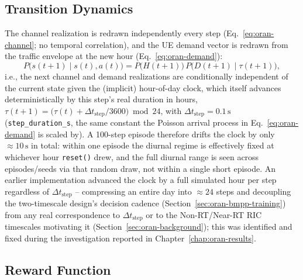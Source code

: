 \subsection{Transition Dynamics}

The channel realization is redrawn independently every step
(Eq.~\ref{eq:oran-channel}; no temporal correlation), and the UE demand
vector is redrawn from the traffic envelope at the new hour
(Eq.~\ref{eq:oran-demand}):
\begin{equation}
  P\big(s(t+1) \mid s(t), a(t)\big) = P\big(H(t+1)\big)\, P\big(D(t+1) \mid \tau(t+1)\big),
  \label{eq:oran-transition}
\end{equation}
i.e., the next channel and demand realizations are conditionally
independent of the current state given the (implicit) hour-of-day clock,
which itself advances deterministically by this step's real duration in
hours, $\tau(t+1) = \big(\tau(t) + \Delta t_{\mathrm{step}}/3600\big) \bmod 24$,
with $\Delta t_{\mathrm{step}} = 0.1\,\mathrm{s}$ (\texttt{step\_duration\_s},
the same constant the Poisson arrival process in
Eq.~\ref{eq:oran-demand} is scaled by). A 100-step episode therefore
drifts the clock by only $\approx\!10\,\mathrm{s}$ in total: within one
episode the diurnal regime is effectively fixed at whichever hour
\texttt{reset()} drew, and the full diurnal range is seen across
episodes/seeds via that random draw, not within a single short episode.
An earlier implementation advanced the clock by a full simulated hour
per step regardless of $\Delta t_{\mathrm{step}}$ -- compressing an
entire day into $\approx\!24$ steps and decoupling the two-timescale
design's decision cadence (Section~\ref{sec:oran-bmpp-training}) from any
real correspondence to $\Delta t_{\mathrm{step}}$ or to the Non-RT/Near-RT
RIC timescales motivating it (Section~\ref{sec:oran-background}); this was
identified and fixed during the investigation reported in
Chapter~\ref{chap:oran-results}.

\subsection{Reward Function}

